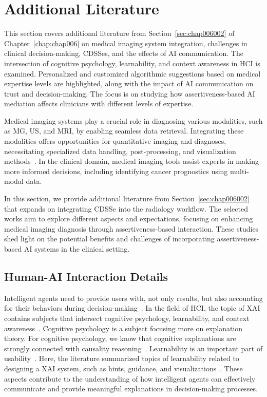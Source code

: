 \section{Additional Literature}
\label{sec:app005003}

This section covers additional literature from Section~\ref{sec:chap006002} of Chapter~\ref{chap:chap006} on medical imaging system integration, challenges in clinical decision-making, \acp{CDSSe}, and the effects of \ac{AI} communication. The intersection of cognitive psychology, learnability, and context awareness in \ac{HCI} is examined. Personalized and customized algorithmic suggestions based on medical expertise levels are highlighted, along with the impact of \ac{AI} communication on trust and decision-making. The focus is on studying how assertiveness-based \ac{AI} mediation affects clinicians with different levels of expertise.

Medical imaging systems play a crucial role in diagnosing various modalities, such as \ac{MG}, \ac{US}, and \ac{MRI}, by enabling seamless data retrieval.
Integrating these modalities offers opportunities for quantitative imaging and diagnoses, necessitating specialized data handling, post-processing, and visualization methods~\cite{Igarashi:2016:IVS:2984511.2984537}.
In the clinical domain, medical imaging tools assist experts in making more informed decisions, including identifying cancer prognostics using multi-modal data.

In this section, we provide additional literature from Section~\ref{sec:chap006002} that expands on integrating \ac{CDSSe} into the radiology workflow.
The selected works aim to explore different aspects and expectations, focusing on enhancing medical imaging diagnosis through assertiveness-based interaction.
These studies shed light on the potential benefits and challenges of incorporating assertiveness-based \ac{AI} systems in the clinical setting.

\subsection{Human-AI Interaction Details}
\label{sec:app005003001}

Intelligent agents need to provide users with, not only results, but also accounting for their behaviors during decision-making~\cite{10.1145/3313831.3376807}.
In the field of \ac{HCI}, the topic of \ac{XAI} contains subjects that intersect cognitive psychology, learnability, and context awareness~\cite{doi:10.1073/pnas.1618211113}.
Cognitive psychology is a subject focusing more on explanation theory.
For cognitive psychology, we know that cognitive explanations are strongly connected with causality reasoning~\cite{10.1145/3544548.3580682}.
Learnability is an important part of usability~\cite{CALISTO2021102607}.
Here, the literature summarized topics of learnability related to designing a \ac{XAI} system, such as hints, guidance, and visualizations~\cite{CALISTO2022102285}.
These aspects contribute to the understanding of how intelligent agents can effectively communicate and provide meaningful explanations in decision-making processes.

